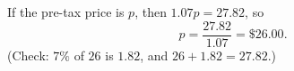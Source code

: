 If the pre-tax price is $p$, then $1.07p=27.82$, so
\[
p=\dfrac{27.82}{1.07}=\boxed{\$26.00}.
\]
(Check: $7\%$ of $26$ is $1.82$, and $26+1.82=27.82$.)

